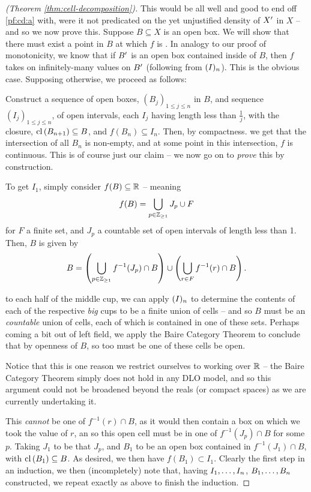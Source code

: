 \begin{proof}[\CD (Theorem \ref{thm:cell-decomposition})]
  This would be all well and good to end off \ref{pf:cd:a} with, were it not predicated on the yet unjustified density of $\Xprime$ in $X$ -- and so we now prove this. Suppose $B \subseteq X$ is an open box. We will show that there must exist a point in $B$ at which $f$ is \cont. In analogy to our proof of monotonicity, we know that if $\Xprime[B]$ is an open box contained inside of $B$, then $f$ takes on infinitely-many values on $\Xprime[B]$ (following from $\In$). This is the obvious case. Supposing otherwise, we proceed as follows:

  Construct a sequence of open boxes, $(B_j)_{1 \leq j \leq n}$ in $B$, and sequence $(I_j)_{1 \leq j \leq n}$, of open intervals, each $I_j$ having length less than $\frac{1}{j}$, with the closure, $\cl{B_{n+1}} \subseteq B$, and $f(B_n) \subseteq I_n$. Then, by compactness. we get that the intersection of all $B_n$ is non-empty, and at some point in this intersection, $f$ is continuous. This is of course just our claim -- we now go on to \emph{prove} this by construction.

  To get $I_1$, simply consider $f(B) \subseteq \R$ -- meaning
  \begin{align*}
    f(B) = \bigcup_{p \in \Zgeq{1}} J_p \cup F
  \end{align*}
  for $F$ a finite set, and $J_p$ a countable set of open intervals of length less than 1. Then, $B$ is given by
  \begin{align*}
    B = \left( \bigcup_{p \in \Zgeq{1}} f^{-1}(J_p) \cap B \right) \cup \left( \bigcup_{r \in F} f^{-1}(r) \cap B \right).
  \end{align*}

  to each half of the middle cup, we can apply $\In$ to determine the contents of each of the respective \emph{big} cups to be a finite union of cells -- and so $B$ must be an \emph{countable} union of cells, each of which is contained in one of these sets. Perhaps coming a bit out of left field, we apply the Baire Category Theorem to conclude that by openness of $B$, so too must be one of these cells be open.
  \begin{svgraybox}
    Notice that this is one reason we restrict ourselves to working over $\R$ -- the Baire Category Theorem simply does not hold in any DLO model, and so this argument could not be broadened beyond the reals (or compact spaces) as we are currently undertaking it.
  \end{svgraybox}
  This \emph{cannot} be one of $f^{-1}(r) \cap B$, as it would then contain a box on which we took the value of $r$, an so this open cell must be in one of $f^{-1}(J_p) \cap B$ for some $p$. Taking $J_1$ to be that $J_p$, and $B_1$ to be an open box contained in $f^{-1}(J_1) \cap B$, with $\cl{B_1} \subseteq B$. As desired, we then have $f(B_1) \subset I_1$. Clearly the first step in an induction, we then (incompletely) note that, having $\vonevm{I}{n}$, $\vonevm{B}{n}$ constructed, we repeat exactly as above to finish the induction.


\end{proof}
